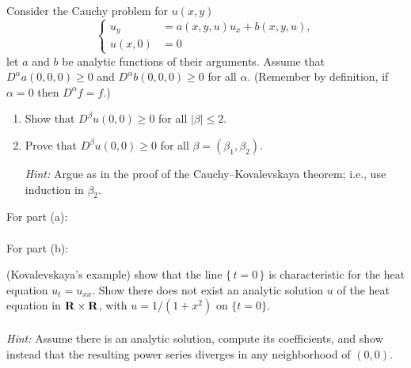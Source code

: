 \begin{problem}
  Consider the Cauchy problem for \(u(x,y)\)
  \[
    \left\{
      \begin{aligned}
        u_y&=a(x, y, u)u_x+b(x,y,u),\\
        u(x,0)&=0
      \end{aligned}
    \right.
  \]
  let \(a\) and \(b\) be analytic functions of their arguments. Assume that
  \(D^\alpha a(0,0,0)\geq 0\) and \(D^\alpha b(0,0,0)\geq 0\) for all
  \(\alpha\). (Remember by definition, if \(\alpha=0\) then
  \(D^\alpha f=f\).)
  \begin{enumerate}[label=(\alph*),noitemsep]
  \item Show that \(D^\beta u(0,0)\geq 0\) for all \(|\beta|\leq 2\).
  \item Prove that \(D^\beta u(0,0)\geq 0\) for all
    \(\beta=(\beta_1,\beta_2)\).

    \noindent \emph{Hint:} Argue as in the proof of the
    Cauchy--Kovalevskaya theorem; i.e., use induction in \(\beta_2\).
  \end{enumerate}
\end{problem}
\begin{solution*}
  For part (a):
  \\\\
  For part (b):
\end{solution*}

\begin{problem}
  (Kovalevskaya's example) show that the line \(\{\,t=0\,\}\) is
  characteristic for the heat equation \(u_t=u_{xx}\). Show there does not
  exist an analytic solution \(u\) of the heat equation in
  \(\mathbf{R}\times\mathbf{R}\), with \(u=1/(1+x^2)\) on \(\{t=0\}\).
  \\\\
  \emph{Hint:} Assume there is an analytic solution, compute its
  coefficients, and show instead that the resulting power series diverges
  in any neighborhood of \((0,0)\).
\end{problem}
\begin{solution*}
\end{solution*}


